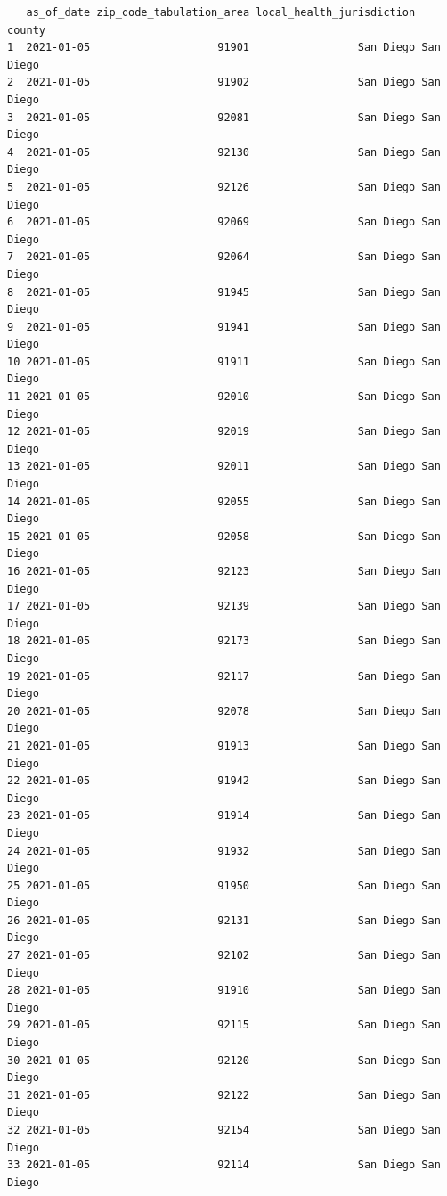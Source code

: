 \documentclass[
  letterpaper,
  DIV=11,
  numbers=noendperiod]{scrartcl}
\begin{document}
\begin{verbatim}
   as_of_date zip_code_tabulation_area local_health_jurisdiction    county
1  2021-01-05                    91901                 San Diego San Diego
2  2021-01-05                    91902                 San Diego San Diego
3  2021-01-05                    92081                 San Diego San Diego
4  2021-01-05                    92130                 San Diego San Diego
5  2021-01-05                    92126                 San Diego San Diego
6  2021-01-05                    92069                 San Diego San Diego
7  2021-01-05                    92064                 San Diego San Diego
8  2021-01-05                    91945                 San Diego San Diego
9  2021-01-05                    91941                 San Diego San Diego
10 2021-01-05                    91911                 San Diego San Diego
11 2021-01-05                    92010                 San Diego San Diego
12 2021-01-05                    92019                 San Diego San Diego
13 2021-01-05                    92011                 San Diego San Diego
14 2021-01-05                    92055                 San Diego San Diego
15 2021-01-05                    92058                 San Diego San Diego
16 2021-01-05                    92123                 San Diego San Diego
17 2021-01-05                    92139                 San Diego San Diego
18 2021-01-05                    92173                 San Diego San Diego
19 2021-01-05                    92117                 San Diego San Diego
20 2021-01-05                    92078                 San Diego San Diego
21 2021-01-05                    91913                 San Diego San Diego
22 2021-01-05                    91942                 San Diego San Diego
23 2021-01-05                    91914                 San Diego San Diego
24 2021-01-05                    91932                 San Diego San Diego
25 2021-01-05                    91950                 San Diego San Diego
26 2021-01-05                    92131                 San Diego San Diego
27 2021-01-05                    92102                 San Diego San Diego
28 2021-01-05                    91910                 San Diego San Diego
29 2021-01-05                    92115                 San Diego San Diego
30 2021-01-05                    92120                 San Diego San Diego
31 2021-01-05                    92122                 San Diego San Diego
32 2021-01-05                    92154                 San Diego San Diego
33 2021-01-05                    92114                 San Diego San Diego

\end{verbatim}
\end{document}
